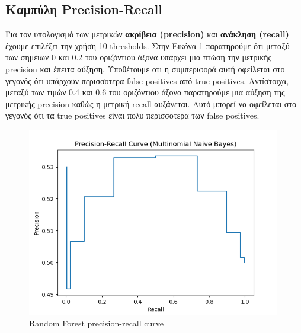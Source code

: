 \documentclass[12pt]{article}
\begin{document}
\subsection{Καμπύλη Precision-Recall}
Για τον υπολογισμό των μετρικών \textbf{ακρίβεια (precision)} και \textbf{ανάκληση (recall)} έχουμε επιλέξει την χρήση 10 thresholds. Στην Εικόνα \ref{fig:rf-precision-recall} παρατηρούμε ότι μεταξύ των σημέιων 0 και 0.2 του οριζόντιου άξονα υπάρχει μια πτώση την μετρικής precision και έπειτα αύξηση. Υποθέτουμε οτι η συμπεριφορά αυτή οφείλεται στο γεγονός ότι υπάρχουν περισσοτερα false positives από true positives. Αντίστοιχα, μεταξύ των τιμών 0.4 και 0.6 του οριζόντιου άξονα παρατηρούμε μια αύξηση της μετρικής precision καθώς η μετρική recall αυξάνεται. Αυτό μπορεί να οφείλεται στο γεγονός ότι τα true positives είναι πολυ περισσοτερα των false positives.
\begin{figure}[H]
    \centering
    \includegraphics[scale=1]{images/rf-precision-recall}
    \caption{Random Forest precision-recall curve}
    \label{fig:rf-precision-recall}
 \end{figure}
\end{document}
